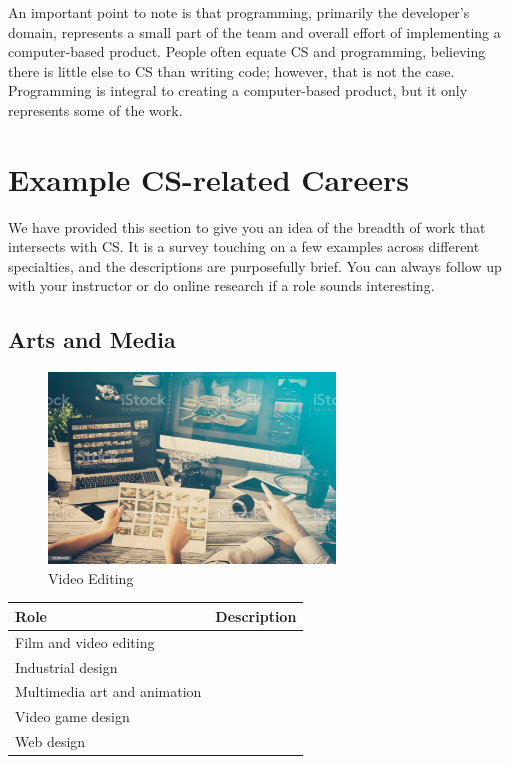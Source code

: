 An important point to note is that programming, primarily the developer's domain, represents a small part of the team and overall effort of implementing a computer-based product. People often equate CS and programming, believing there is little else to CS than writing code; however, that is not the case. Programming is integral to creating a computer-based product, but it only represents some of the work.



\section{Example CS-related Careers}

We have provided this section to give you an idea of the breadth of work that intersects with CS. It is a survey touching on a few examples across different specialties, and the descriptions are purposefully brief. You can always follow up with your instructor or do online research if a role sounds interesting.

\subsection{Arts and Media}

\begin{figure}[H]
	\begin{center}
		\caption{Video Editing}
		\vskip 4pt
		\includegraphics[height=2in]{images/careers/istockphoto-922654000-1024x1024.jpg}
	\end{center}
\end{figure}

\begin{table}[H]
	\begin{center}
		\begin{tabular}{p{1.5in}|p{2.9in}} 
			\textbf{Role} & \textbf{Description}\\
			\hline
			Film and video editing & \\
			\hline
			Industrial design & \\
			\hline
			Multimedia art and animation & \\
			\hline
			Video game design & \\
			\hline
			Web design & \\
		\end{tabular}
	\end{center}
\end{table}


